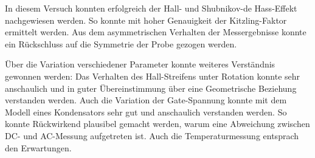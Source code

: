 
In diesem Versuch konnten erfolgreich der Hall- und Shubnikov-de Hass-Effekt nachgewiesen werden. So konnte mit hoher Genauigkeit der Kitzling-Faktor ermittelt werden. Aus dem asymmetrischen Verhalten der Messergebnisse konnte ein Rückschluss auf die Symmetrie der Probe gezogen werden.

Über die Variation verschiedener Parameter konnte weiteres Verständnis gewonnen werden: Das Verhalten des Hall-Streifens unter Rotation konnte sehr anschaulich und in guter Übereinstimmung über eine Geometrische Beziehung verstanden werden. Auch die Variation der Gate-Spannung konnte mit dem Modell eines Kondensators sehr gut und anschaulich verstanden werden. So konnte Rückwirkend plausibel gemacht werden, warum eine Abweichung zwischen DC- und AC-Messung aufgetreten ist. Auch die Temperaturmessung entsprach den Erwartungen.